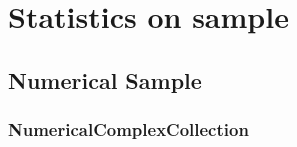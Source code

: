 \newpage
{}
\section{Statistics on sample}


\subsection{Numerical Sample}

\subsubsection{NumericalComplexCollection}

